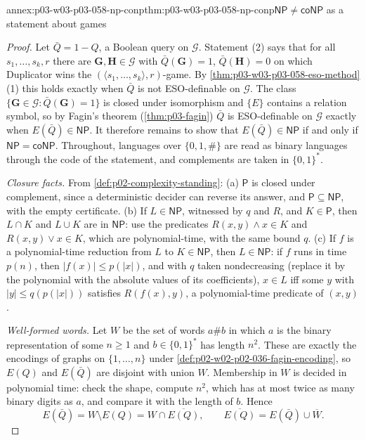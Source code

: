 \begin{annexitem}{annex:p03-w03-p03-058-np-conp}{thm:p03-w03-p03-058-np-conp}{\(\mathsf{NP}\ne\mathsf{coNP}\) as a statement about games}
\begin{proof}
Let \(\bar Q=1-Q\), a Boolean query on \(\mathcal G\). Statement (2) says
that for all \(s_1,\ldots,s_k,r\) there are \(\mathbf G,\mathbf H\in
\mathcal G\) with \(\bar Q(\mathbf G)=1\), \(\bar Q(\mathbf H)=0\) on which
Duplicator wins the \((\langle s_1,\ldots,s_k\rangle,r)\)-game. By
\cref{thm:p03-w03-p03-058-eso-method}(1) this holds exactly when \(\bar Q\) is
not ESO-definable on \(\mathcal G\). The class \(\{\mathbf G\in\mathcal G:
\bar Q(\mathbf G)=1\}\) is closed under isomorphism and \(\{E\}\) contains a
relation symbol, so by Fagin's theorem (\cref{thm:p03-fagin}) \(\bar Q\) is
ESO-definable on \(\mathcal G\) exactly when \(E(\bar Q)\in\mathsf{NP}\). It
therefore remains to show that \(E(\bar Q)\in\mathsf{NP}\) if and only if
\(\mathsf{NP}=\mathsf{coNP}\). Throughout, languages over \(\{0,1,\#\}\)
are read as binary languages through the code of the statement, and
complements are taken in \(\{0,1\}^*\).

\emph{Closure facts.} From \cref{def:p02-complexity-standing}: (a)
\(\mathsf P\) is closed under complement, since a deterministic decider can
reverse its answer, and \(\mathsf P\subseteq\mathsf{NP}\), with the empty
certificate. (b) If \(L\in\mathsf{NP}\), witnessed by \(q\) and \(R\), and
\(K\in\mathsf P\), then \(L\cap K\) and \(L\cup K\) are in \(\mathsf{NP}\):
use the predicates \(R(x,y)\wedge x\in K\) and \(R(x,y)\vee x\in K\), which
are polynomial-time, with the same bound \(q\). (c) If \(f\) is a
polynomial-time reduction from \(L\) to \(K\in\mathsf{NP}\), then
\(L\in\mathsf{NP}\): if \(f\) runs in time \(p(n)\), then
\(|f(x)|\le p(|x|)\), and with \(q\) taken nondecreasing (replace it by the
polynomial with the absolute values of its coefficients),
\(x\in L\) iff some \(y\) with \(|y|\le q(p(|x|))\) satisfies
\(R(f(x),y)\), a polynomial-time predicate of \((x,y)\).

\emph{Well-formed words.} Let \(W\) be the set of words \(a\#b\) in which
\(a\) is the binary representation of some \(n\ge1\) and \(b\in\{0,1\}^*\)
has length \(n^2\). These are exactly the encodings of graphs on
\(\{1,\ldots,n\}\) under \cref{def:p02-w02-p02-036-fagin-encoding}, so
\(E(Q)\) and \(E(\bar Q)\) are disjoint with union \(W\). Membership in
\(W\) is decided in polynomial time: check the shape, compute \(n^2\), which
has at most twice as many binary digits as \(a\), and compare it with the
length of \(b\). Hence
\[
 E(\bar Q)=W\setminus E(Q)=W\cap\overline{E(Q)},\qquad
 \overline{E(Q)}=E(\bar Q)\cup\overline W .
\]


\end{proof}
\end{annexitem}
